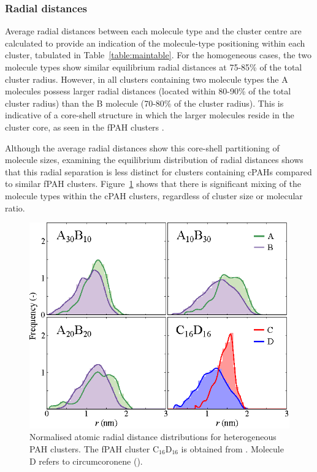 \subsubsection{Radial distances}
Average radial distances between each molecule type and the cluster centre are calculated to provide an indication of the molecule-type positioning within each cluster, tabulated in  Table~\ref{table:maintable}. For the homogeneous cases, the two molecule types show similar equilibrium radial distances at 75-85\% of the total cluster radius. However, in all clusters containing two molecule types the A molecules possess larger radial distances (located within 80-90\% of the total cluster radius) than the B molecule (70-80\% of the cluster radius). This is indicative of a core-shell structure in which the larger molecules reside in the cluster core, as seen in the fPAH clusters \cite{bowal2018partitioning}.

Although the average radial distances show this core-shell partitioning of molecule sizes, examining the equilibrium distribution of radial distances shows that this radial separation is less distinct for clusters containing cPAHs compared to similar fPAH clusters. Figure~\ref{fig:radialdists_atomic} shows that there is significant mixing of the molecule types within the cPAH clusters, regardless of cluster size or molecular ratio.

%
\begin{figure}[!tbh]
\centering
\includegraphics[width=0.8\linewidth]{Figures/radii_histograms_aa.eps}
\caption{Normalised atomic radial distance distributions for heterogeneous PAH clusters. The fPAH cluster $\text{C}_{\text{16}}\text{D}_{\text{16}}$ is obtained from \citet{bowal2018partitioning}. Molecule D refers to circumcoronene ().}
\label{fig:radialdists_atomic}
\end{figure}
%

